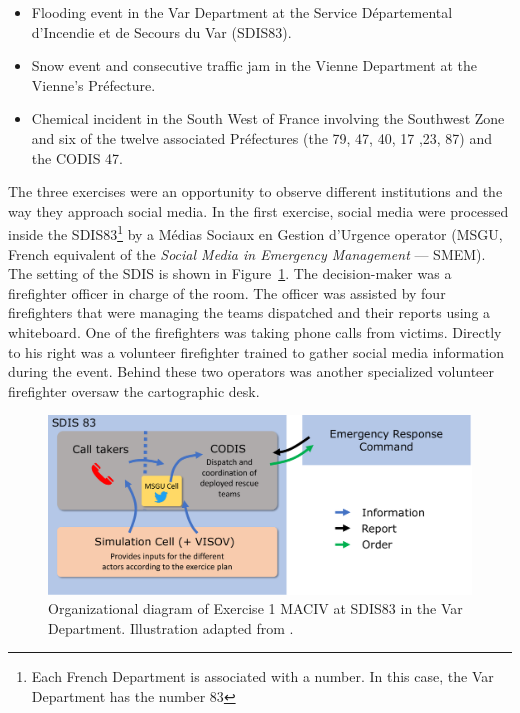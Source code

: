 \begin{itemize}
    \item Flooding event in the Var Department at the Service Départemental d’Incendie et de Secours du Var (SDIS83).
    \item Snow event and consecutive traffic jam in the Vienne Department at the Vienne's Préfecture.
    \item Chemical incident in the South West of France involving the Southwest Zone and six of the twelve associated Préfectures (the 79, 47, 40, 17 ,23, 87) and the CODIS 47.
\end{itemize}

The three exercises were an opportunity to observe different institutions and the way they approach social media.
In the first exercise, social media were processed inside the SDIS83\footnote{Each French Department is associated with a number. In this case, the Var Department has the number 83}
by a Médias Sociaux en Gestion d’Urgence operator (MSGU, French equivalent of the \textit{Social Media in Emergency Management} — SMEM).
The setting of the SDIS is shown in Figure~\ref{information:exercice-1-setup}.
The decision-maker was a firefighter officer in charge of the room.
The officer was assisted by four firefighters that were managing the teams dispatched and their reports using a whiteboard.
One of the firefighters was taking phone calls from victims.
Directly to his right was a volunteer firefighter trained to gather social media information during the event.
Behind these two operators was another specialized volunteer firefighter oversaw the cartographic desk.

\begin{figure}[htb]
    \centering
    \includegraphics[width=\textwidth]{figures/chap-3/exercice-1-setup.pdf}
    \caption{Organizational diagram of Exercise 1 MACIV at SDIS83 in the Var Department. Illustration adapted from \textcite{batardIntegrerContributionsCitoyennes2021}.}
    \label{information:exercice-1-setup}
\end{figure}

